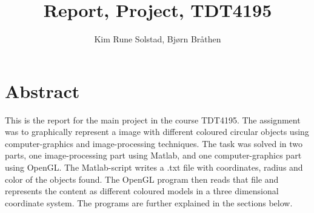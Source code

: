 \documentclass[english, a4paper]{article}
\title{Report, Project, TDT4195}
\author{Kim Rune Solstad, Bjørn Bråthen}
\begin{document}
\maketitle

\section{Abstract}
This is the report for the main project in the course TDT4195. The assignment was to graphically represent a image with different coloured circular objects using computer-graphics and image-processing techniques. The task was solved in two parts, one image-processing part using Matlab, and one computer-graphics part using OpenGL. The Matlab-script writes a .txt file with coordinates, radius and color of the objects found. The OpenGL program then reads that file and represents the content as different coloured models in a three dimensional coordinate system. The programs are further explained in the sections below. 





\newpage

\end{document}
